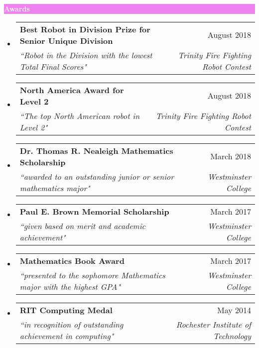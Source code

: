 \documentclass[letterpaper,11pt]{article}
\makeatletter
\newcommand{\resheading}[1]{{\large \colorbox{violet}{\begin{minipage}{\textwidth}{\textbf{#1 \vphantom{p\^{E}}}}\end{minipage}}}}
\newcommand{\ressubheading}[4]{
	\begin{tabular*}{7.0in}{l@{\extracolsep{\fill}}r}
		\textbf{#1} & #2 \\
		\textit{#3} & \textit{#4} \\
	\end{tabular*}\vspace{-6pt}}
\makeatother
\begin{document}
		\resheading{\textcolor{white}{Awards}}

		\begin{itemize}[topsep=3pt, itemsep=1pt]
			\item
			\ressubheading{Best Robot in Division Prize for Senior Unique Division}{August 2018}{``Robot in the Division with the lowest Total Final Scores"}{Trinity Fire Fighting Robot Contest}
			\item
			\ressubheading{North America Award for Level 2}{August 2018}{``The top North American robot in Level 2"}{Trinity Fire Fighting Robot Contest}
			\item
			\ressubheading{Dr. Thomas R. Nealeigh Mathematics Scholarship}{March 2018}{``awarded to an outstanding junior or senior mathematics major"}{Westminster College}
			\item
			\ressubheading{Paul E. Brown Memorial Scholarship}{March 2017}{``given based on merit and academic achievement"}{Westminster College}
			\item
			\ressubheading{Mathematics Book Award}{March 2017}{``presented to the sophomore Mathematics major with the highest GPA"}{Westminster College}
			\item
			\ressubheading{RIT Computing Medal}{May 2014}{``in recognition of outstanding achievement in computing"}{Rochester Institute of Technology}
		\end{itemize}
\end{document}
